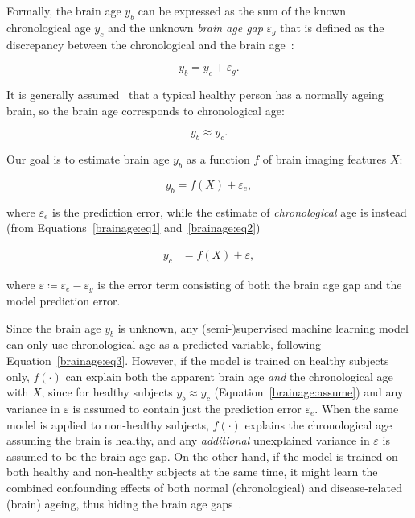 Formally, the brain age $y_b$ can be expressed as the sum of the known chronological age $y_c$ and the unknown \textit{brain age gap} $\varepsilon_g$ that is defined as the discrepancy between the chronological and the brain age~\cite{niu2019improved}:

\begin{equation}
    \label{brainage:eq1}
    y_b = y_c + \varepsilon_g.
\end{equation}

It is generally assumed~\cite{franke2019ten} that a typical healthy person has a normally ageing brain, so the brain age corresponds to chronological age:

\begin{equation}
    \label{brainage:assume}
    y_b \approx y_c.
\end{equation}

Our goal is to estimate brain age $y_b$ as a function $f$ of brain imaging features $X$:

\begin{equation}
    \label{brainage:eq2}
    y_b = f(X) + \varepsilon_e,
\end{equation}

where $\varepsilon_e$ is the prediction error, while the estimate of \textit{chronological} age is instead (from Equations~\eqref{brainage:eq1} and~\eqref{brainage:eq2})

\begin{align}
    y_c &= f(X) + \varepsilon,
        \label{brainage:eq3}
\end{align}

where $\varepsilon \coloneqq \varepsilon_e - \varepsilon_g$ is the error term consisting of both the brain age gap and the model prediction error.

Since the brain age $y_b$ is unknown, any (semi-)supervised machine learning model can only use chronological age as a predicted variable, following Equation~\eqref{brainage:eq3}. However, if the model is trained on healthy subjects only, $f(\cdot)$ can explain both the apparent brain age \textit{and} the chronological age with $X$, since for healthy subjects $y_b \approx y_c$ (Equation~\eqref{brainage:assume}) and any variance in $\varepsilon$ is assumed to contain just the prediction error $\varepsilon_e$. When the same model is applied to non-healthy subjects, $f(\cdot)$ explains the chronological age assuming the brain is healthy, and any \textit{additional} unexplained variance in $\varepsilon$ is assumed to be the brain age gap. On the other hand, if the model is trained on both healthy and non-healthy subjects at the same time, it might learn the combined confounding effects of both normal (chronological) and disease-related (brain) ageing, thus hiding the brain age gaps~\cite{dukart2011age}.

